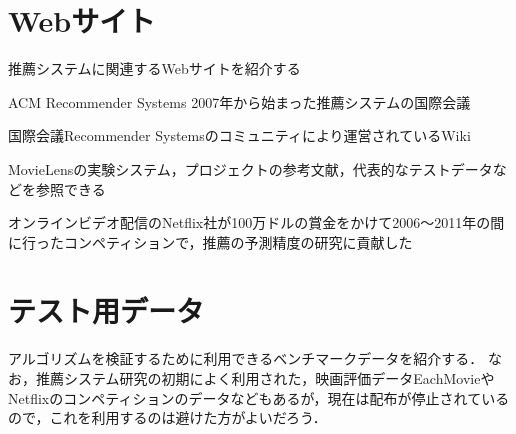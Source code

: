 \section{Webサイト}
\label{sec:reference-www}

推薦システムに関連するWebサイトを紹介する
\begin{description}
\item{ACM Recommender Systems}
2007年から始まった推薦システムの国際会議\cite{url:023}
\item[ACM RecSysWiki]
国際会議Recommender Systemsのコミュニティにより運営されているWiki\cite{url:024}
\item[GroupLens Research Lab.]
MovieLensの実験システム，プロジェクトの参考文献，代表的なテストデータなどを参照できる\cite{url:012}
\item[Netflix Prize]
オンラインビデオ配信のNetflix社が100万ドルの賞金をかけて2006〜2011年の間に行ったコンペティションで，推薦の予測精度の研究に貢献した\cite{url:022}
\end{description}

\section{テスト用データ}
\label{sec:reference-data}

アルゴリズムを検証するために利用できるベンチマークデータを紹介する．
なお，推薦システム研究の初期によく利用された，映画評価データEachMovieやNetflixのコンペティションのデータなどもあるが，現在は配布が停止されているので，これを利用するのは避けた方がよいだろう．

